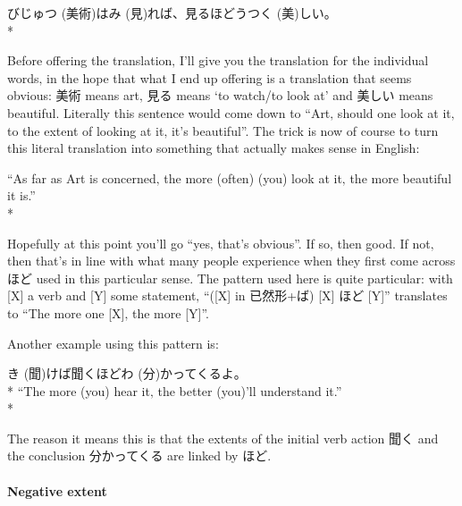 \documentclass[11pt, b5paper, twoside, openright, onecolumn]{book}
\makeatletter
\newcommand*{\rubystack}[2]{{\relscale{0.5}%
  \begin{tabular}[b]{@{}c@{}}%
    {#1}\\%
   {\textscale{2}{#2}}%
  \end{tabular}}%
}
\DeclareRobustCommand*{\ruby}[2]{%
  \mbox{%
    \setlength{\parskip}{0ex}%
    \BeginAccSupp{method=pdfstringdef,ActualText={#1}}%
      \rubystack{\phantom{#2}}{#1}%
      \llap{%
        \rubystack{#2}{\phantom{#1}}%
      }%
    \EndAccSupp{}%
  }%
}
\renewcommand*{\ruby}[2]{#2 (#1)}%
\newenvironment{exampleblock}{
\setlength{\parindent}{0.6in}
\begin{minipage}[t]{\dimexpr\textwidth-\parindent}}
{\end{minipage}}
\makeatother
\begin{document}
\vspace{0.4cm}
\begin{exampleblock}
\ruby{美術}{びじゅつ}は\ruby{見}{み}れば、見るほど\ruby{美}{うつく}しい。 \\* 
\end{exampleblock}
\vspace{0.2cm}

Before offering the translation‚ I’ll give you the translation for the individual words‚ in the hope that what I end up offering is a translation that seems obvious: 美術 means art‚ 見る means ‘to watch/to look at’ and 美しい means beautiful. Literally this sentence would come down to “Art‚ should one look at it‚ to the extent of looking at it‚ it’s beautiful”. The trick is now of course to turn this literal translation into something that actually makes sense in English:

\vspace{0.4cm}
\begin{exampleblock}
“As far as Art is concerned‚ the more (often) (you) look at it‚ the more beautiful it is.” \\* 
\end{exampleblock}
\vspace{0.2cm}

Hopefully at this point you’ll go “yes‚ that’s obvious”. If so‚ then good. If not‚ then that’s in line with what many people experience when they first come across ほど used in this particular sense. The pattern used here is quite particular: with [X] a verb and [Y] some statement‚ “([X] in 已然形+ば) [X] ほど [Y]” translates to “The more one [X]‚ the more [Y]”.

Another example using this pattern is:

\vspace{0.4cm}
\begin{exampleblock}
\ruby{聞}{き}けば聞くほど\ruby{分}{わ}かってくるよ。 \\* 
“The more (you) hear it‚ the better (you)’ll understand it.” \\* 
\end{exampleblock}
\vspace{0.2cm}

The reason it means this is that the extents of the initial verb action 聞く and the conclusion 分かってくる are linked by ほど.

\paragraph{Negative extent}
\end{document}
